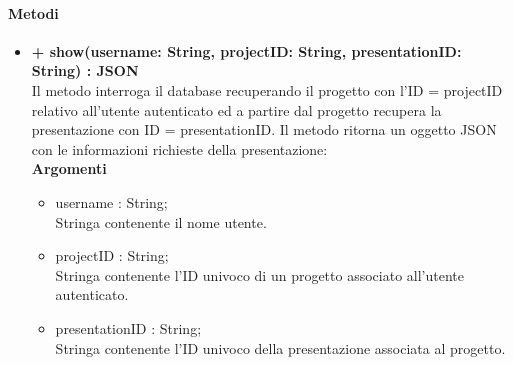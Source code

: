 	\paragraph{Metodi}
		\begin{itemize}
			\item \textbf{+ show(username: String, projectID: String, presentationID: String) : JSON}\\
			Il metodo interroga il database recuperando il progetto con l'ID = projectID relativo all'utente autenticato ed a partire dal progetto recupera la presentazione con ID = presentationID. Il metodo ritorna un oggetto JSON con le informazioni richieste della presentazione:\\
			\textbf{Argomenti}
			\begin{itemize}
				\item username : String; \\
				Stringa contenente il nome utente.
				\item projectID : String; \\
				Stringa contenente l'ID univoco di un progetto associato all'utente autenticato.
				\item presentationID : String; \\
				Stringa contenente l'ID univoco della presentazione associata al progetto.
			\end{itemize}
			

\end{itemize}
